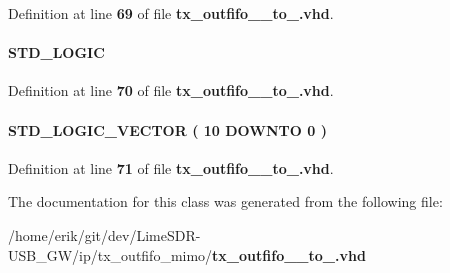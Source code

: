 Definition at line {\bf 69} of file {\bf tx\+\_\+outfifo\+\_\+\_\+to\+\_.\+vhd}.

\paragraph[{sub\+\_\+wire5}]{ {\bfseries \textcolor{comment}{S\+T\+D\+\_\+\+L\+O\+G\+IC}\textcolor{vhdlchar}{ }} \hspace{0.3cm}{\ttfamily [Signal]}}\label{classtx__outfifo__16__to__32_1_1SYN_a428d095cdf1fa14d47c103e910135ebb}


Definition at line {\bf 70} of file {\bf tx\+\_\+outfifo\+\_\+\_\+to\+\_.\+vhd}.

\paragraph[{sub\+\_\+wire6}]{ {\bfseries \textcolor{comment}{S\+T\+D\+\_\+\+L\+O\+G\+I\+C\+\_\+\+V\+E\+C\+T\+OR}\textcolor{vhdlchar}{ }\textcolor{vhdlchar}{(}\textcolor{vhdlchar}{ }\textcolor{vhdlchar}{ } \textcolor{vhdldigit}{10} \textcolor{vhdlchar}{ }\textcolor{keywordflow}{D\+O\+W\+N\+TO}\textcolor{vhdlchar}{ }\textcolor{vhdlchar}{ } \textcolor{vhdldigit}{0} \textcolor{vhdlchar}{ }\textcolor{vhdlchar}{)}\textcolor{vhdlchar}{ }} \hspace{0.3cm}{\ttfamily [Signal]}}\label{classtx__outfifo__16__to__32_1_1SYN_a18791eb0608ed4ce1bfd6d81c225996f}


Definition at line {\bf 71} of file {\bf tx\+\_\+outfifo\+\_\+\_\+to\+\_.\+vhd}.



The documentation for this class was generated from the following file\+:\begin{DoxyCompactItemize}
\item 
/home/erik/git/dev/\+Lime\+S\+D\+R-\/\+U\+S\+B\+\_\+\+G\+W/ip/tx\+\_\+outfifo\+\_\+mimo/{\bf tx\+\_\+outfifo\+\_\+\_\+to\+\_.\+vhd}\end{DoxyCompactItemize}
